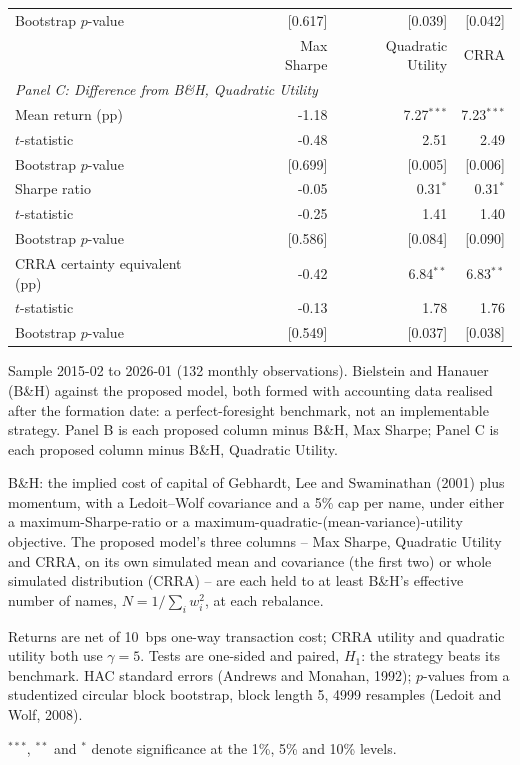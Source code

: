 \begin{table}[htbp]
\begin{threeparttable}
\begin{tabular}{lrrrrr}
\quad Bootstrap $p$-value &  &  & [0.617] & [0.039] & [0.042] \\
\addlinespace
\midrule
 &  &  & {Max Sharpe} & {Quadratic Utility} & {CRRA} \\
\midrule
\multicolumn{6}{l}{\textit{Panel C: Difference from B\&H, Quadratic Utility}} \\
Mean return (pp) &  &  & -1.18 & 7.27$^{***}$ & 7.23$^{***}$ \\
\quad $t$-statistic &  &  & -0.48 & 2.51 & 2.49 \\
\quad Bootstrap $p$-value &  &  & [0.699] & [0.005] & [0.006] \\
Sharpe ratio &  &  & -0.05 & 0.31$^{*}$ & 0.31$^{*}$ \\
\quad $t$-statistic &  &  & -0.25 & 1.41 & 1.40 \\
\quad Bootstrap $p$-value &  &  & [0.586] & [0.084] & [0.090] \\
CRRA certainty equivalent (pp) &  &  & -0.42 & 6.84$^{**}$ & 6.83$^{**}$ \\
\quad $t$-statistic &  &  & -0.13 & 1.78 & 1.76 \\
\quad Bootstrap $p$-value &  &  & [0.549] & [0.037] & [0.038] \\
\bottomrule
\end{tabular}
\begin{tablenotes}[flushleft]\footnotesize
\item Sample 2015-02 to 2026-01 (132 monthly observations). Bielstein and Hanauer (B\&H) against the proposed model, both formed with accounting data realised after the formation date: a perfect-foresight benchmark, not an implementable strategy. Panel B is each proposed column minus B\&H, Max Sharpe; Panel C is each proposed column minus B\&H, Quadratic Utility.
\item B\&H: the implied cost of capital of Gebhardt, Lee and Swaminathan (2001) plus momentum, with a Ledoit--Wolf covariance and a 5\% cap per name, under either a maximum-Sharpe-ratio or a maximum-quadratic-(mean-variance)-utility objective. The proposed model's three columns -- Max Sharpe, Quadratic Utility and CRRA, on its own simulated mean and covariance (the first two) or whole simulated distribution (CRRA) -- are each held to at least B\&H's effective number of names, $N=1/\sum_i w_i^2$, at each rebalance.
\item Returns are net of 10~bps one-way transaction cost; CRRA utility and quadratic utility both use $\gamma=5$. Tests are one-sided and paired, $H_1$: the strategy beats its benchmark. HAC standard errors (Andrews and Monahan, 1992); $p$-values from a studentized circular block bootstrap, block length 5, 4999 resamples (Ledoit and Wolf, 2008).
\item $^{***}$, $^{**}$ and $^{*}$ denote significance at the 1\%, 5\% and 10\% levels.
\end{tablenotes}
\end{threeparttable}
\end{table}
